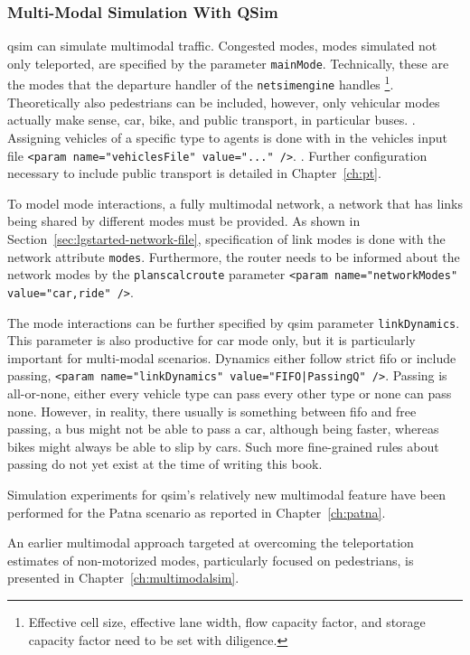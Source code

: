 \subsubsection{Multi-Modal Simulation With QSim}
\label{sec:multimodalsim_qsim}
\gls{qsim} can simulate \gls{multimodal} traffic. Congested modes, \ie modes simulated not only teleported, are specified by the parameter \lstinline|mainMode|. Technically, these are the modes that the departure handler of the \lstinline|netsimengine| handles 
\footnote{Effective cell size, effective lane width, flow capacity factor, and storage capacity factor need to be set with diligence.}. 
Theoretically also pedestrians can be included, however, only vehicular modes actually make sense, \ie car, bike, and public transport, in particular buses. 
. 
Assigning vehicles of a specific type to agents is done with in the vehicles input file \lstinline|<param name="vehiclesFile" value="..." />|. 
. 
Further configuration necessary to include public transport is detailed in Chapter~\ref{ch:pt}.

To model mode interactions, a fully \gls{multimodal} network, \ie a network that has links being shared by different modes must be provided. 
As shown in Section~\ref{sec:lgstarted-network-file}, specification of link modes is done with the network attribute \lstinline|modes|.
Furthermore, the router needs to be informed about the network modes by the \lstinline|planscalcroute| parameter \lstinline|<param name="networkModes" value="car,ride" />|.

The mode interactions can be further specified by \gls{qsim} parameter \lstinline|linkDynamics|. 
This parameter is also productive for car mode only, but it is particularly important for multi-modal scenarios. 
Dynamics either follow strict \gls{fifo} or include passing, \ie \lstinline$<param name="linkDynamics" value="FIFO|PassingQ" />$. 
Passing is all-or-none, \ie either every vehicle type can pass every other type or none can pass none. 
However, in reality, there usually is something between \gls{fifo} and free passing, \eg a bus might not be able to pass a car, although being faster, whereas bikes might always be able to slip by cars. Such more fine-grained rules about passing do not yet exist at the time of writing this book. 

Simulation experiments for \gls{qsim}'s relatively new \gls{multimodal} feature have been performed for the Patna scenario as reported in Chapter~\ref{ch:patna}.

An earlier \gls{multimodal} approach targeted at overcoming the \gls{teleportation} estimates of non-motorized modes, particularly focused on pedestrians, is presented in Chapter~\ref{ch:multimodalsim}.


